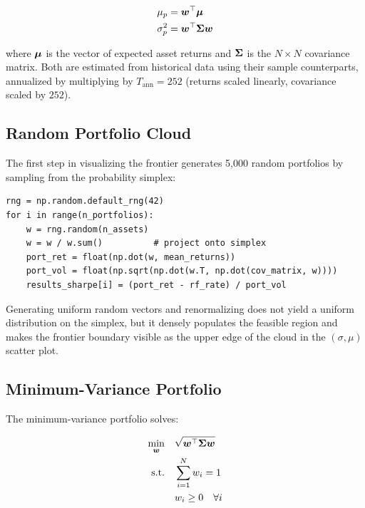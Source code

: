 \begin{align}
  \mu_p &= \boldsymbol{w}^{\top} \boldsymbol{\mu} \label{eq:port-return} \\
  \sigma_p^2 &= \boldsymbol{w}^{\top} \mathbf{\Sigma} \boldsymbol{w} \label{eq:port-variance}
\end{align}

where $\boldsymbol{\mu}$ is the vector of expected asset returns and $\mathbf{\Sigma}$ is the $N \times N$ covariance matrix. Both are estimated from historical data using their sample counterparts, annualized by multiplying by $T_{\text{ann}} = 252$ (returns scaled linearly, covariance scaled by $252$).

\subsection{Random Portfolio Cloud}

The first step in visualizing the frontier generates 5{,}000 random portfolios by sampling from the probability simplex:

\begin{lstlisting}[style=python, caption={Random weight generation -- \filepath{portfolio\_engine.py} lines 376--386}]
rng = np.random.default_rng(42)
for i in range(n_portfolios):
    w = rng.random(n_assets)
    w = w / w.sum()          # project onto simplex
    port_ret = float(np.dot(w, mean_returns))
    port_vol = float(np.sqrt(np.dot(w.T, np.dot(cov_matrix, w))))
    results_sharpe[i] = (port_ret - rf_rate) / port_vol
\end{lstlisting}

Generating uniform random vectors and renormalizing does not yield a uniform distribution on the simplex, but it densely populates the feasible region and makes the frontier boundary visible as the upper edge of the cloud in the $(\sigma, \mu)$ scatter plot.

\subsection{Minimum-Variance Portfolio}

The minimum-variance portfolio solves:

\begin{align}
  \min_{\boldsymbol{w}} \quad & \sqrt{\boldsymbol{w}^{\top} \mathbf{\Sigma} \boldsymbol{w}} \label{eq:minvar-obj} \\
  \text{s.t.} \quad & \sum_{i=1}^{N} w_i = 1 \label{eq:minvar-sum} \\
                    & w_i \geq 0 \quad \forall i \label{eq:minvar-long}
\end{align}

